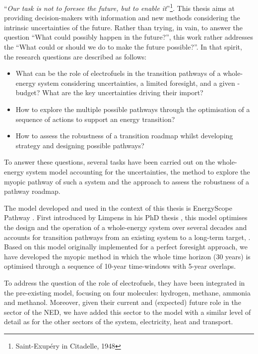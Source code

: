 \noindent
``\textit{Our task is not to foresee the future, but to enable it}''\footnote{Saint-Exupéry in Citadelle, 1948}. This thesis aims at providing decision-makers with information and new methods considering the intrinsic uncertainties of the future.  Rather than trying, in vain, to answer the question ``What could possibly happen in the future?'', this work rather addresses the ``What could or should we do to make the future possible?''. In that spirit, the research questions are described as follows:
\begin{itemize}
\item What can be the role of electrofuels in the transition pathways of a whole-energy system considering uncertainties,  a limited foresight, and a given -budget? What are the key uncertainties driving their import?
\item How to explore the multiple possible pathways through the optimisation of a sequence of actions to support an energy transition?
\item How to assess the robustness of a transition roadmap whilst developing strategy and designing possible pathways?
\end{itemize}

To answer these questions, several tasks have been carried out on the whole-energy system model accounting for the uncertainties, the method to explore the myopic pathway of such a system and the approach to assess the robustness of a pathway roadmap. 

The model developed and used in the context of this thesis is EnergyScope Pathway \cite{limpens2024pathway}. First introduced by Limpens in his PhD thesis \cite{limpens2021generating}, this model optimises the design and the operation of a whole-energy system over several decades and accounts for transition pathways from an existing system to a long-term target, . Based on this model originally implemented for a perfect foresight approach, we have developed the myopic method in which the whole time horizon (30 years) is optimised through a sequence of 10-year time-windows with 5-year overlaps.

To address the question of the role of electrofuels, they have been integrated in the pre-existing model, focusing on four molecules: hydrogen, methane, ammonia and methanol. Moreover, given their current and (expected) future role in the sector of the \gls{NED}, we have added this sector to the model with a similar level of detail as for the other sectors of the system, \ie electricity, heat and transport. 

